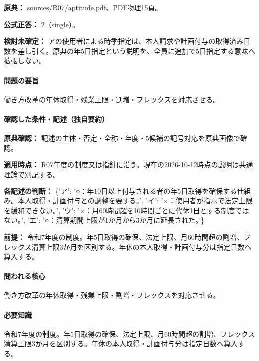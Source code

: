 \noindent\textbf{原典：} sources/R07/aptitude.pdf、PDF物理15頁。

\textbf{公式正答：} 2（single）。

\par\textbf{検討未確定：} アの使用者による時季指定は、本人請求や計画付与の取得済み日数を差し引く。原典の年5日指定という説明を、全員に追加で5日指定する意味へ拡張しない。

\paragraph{問題の要旨} 働き方改革の年休取得・残業上限・割増・フレックスを対応させる。

\paragraph{確認した条件・記述（独自要約）}\mbox{}\par

\noindent\textbf{原典確認：} 記述の主体・否定・全称・年度・5候補の記号対応を原典画像で確認。\par

\noindent\textbf{適用時点：} R07年度の制度又は指針に沿う。現在の2026-10-12時点の説明は共通理論で別記する。\par

\noindent\textbf{各記述の判断：} \{'ア': '○：年10日以上付与される者の年5日取得を確保する仕組み。本人取得・計画付与との調整を要する。', 'イ': '×：使用者が指示で法定上限を緩和できない。', 'ウ': '×：月60時間超を10時間ごとに代休1日とする制度ではない。', 'エ': '○：清算期間上限が1か月から3か月に延長された。'\}\par

\noindent\textbf{前提：} 令和7年度の制度。年5日取得の確保、法定上限、月60時間超の割増、フレックス清算上限3か月を区別する。年休の本人取得・計画付与分は指定日数へ算入する。\par

\paragraph{問われる核心} 働き方改革の年休取得・残業上限・割増・フレックスを対応させる。

\paragraph{必要知識} 令和7年度の制度。年5日取得の確保、法定上限、月60時間超の割増、フレックス清算上限3か月を区別する。年休の本人取得・計画付与分は指定日数へ算入する。


